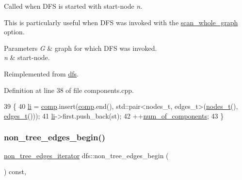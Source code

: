 Called when D\+FS is started with start-\/node {\itshape n}. 

This is particularly useful when D\+FS was invoked with the \mbox{\hyperlink{classdfs_aa7c864a6f3a120720138b187b3ed95b5}{scan\+\_\+whole\+\_\+graph}} option.


\begin{DoxyParams}{Parameters}
{\em G} & graph for which D\+FS was invoked. \\
\hline
{\em n} & start-\/node. \\
\hline
\end{DoxyParams}


Reimplemented from \mbox{\hyperlink{classdfs_a304b14458fb78f9feb3d8d5683d3cab5}{dfs}}.



Definition at line 38 of file components.\+cpp.


\begin{DoxyCode}
39 \{
40     \mbox{\hyperlink{classcomponents_ae88ffb062b1ea4931ecfaa53e871825f}{li}} = \mbox{\hyperlink{classcomponents_a99483a9e5f031e6e6e2e5b0c47c2979e}{comp}}.insert(\mbox{\hyperlink{classcomponents_a99483a9e5f031e6e6e2e5b0c47c2979e}{comp}}.end(), std::pair<nodes\_t, edges\_t>(\mbox{\hyperlink{edge_8h_a22ac17689106ba21a84e7bc54d1199d6}{nodes\_t}}(), 
      \mbox{\hyperlink{edge_8h_a8f9587479bda6cf612c103494b3858e3}{edges\_t}}()));
41     \mbox{\hyperlink{classcomponents_ae88ffb062b1ea4931ecfaa53e871825f}{li}}->first.push\_back(st);
42     ++\mbox{\hyperlink{classcomponents_ad5a54d7313e23f8c6a2c6347e6ee70a0}{num\_of\_components}};
43 \}
\end{DoxyCode}
\mbox{\label{classdfs_a4efe5bb72d00305e6b226e67c2b2ef6e}} 
\subsubsection{\texorpdfstring{non\+\_\+tree\+\_\+edges\+\_\+begin()}{non\_tree\_edges\_begin()}}
{\footnotesize\ttfamily \mbox{\hyperlink{classdfs_a95e353f354d3b31daded0c4fe749171a}{non\+\_\+tree\+\_\+edges\+\_\+iterator}} dfs\+::non\+\_\+tree\+\_\+edges\+\_\+begin (\begin{DoxyParamCaption}{ }\end{DoxyParamCaption}) const\hspace{0.3cm}{\ttfamily [inline]}, {\ttfamily [inherited]}}



